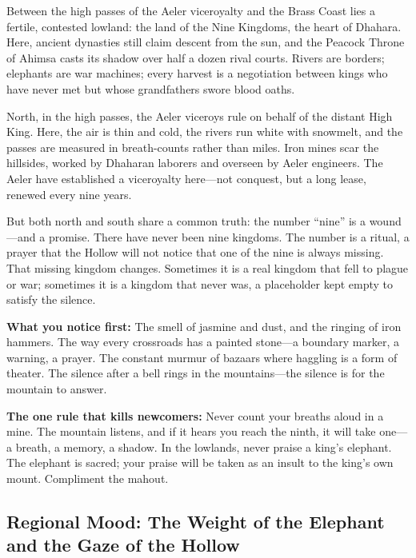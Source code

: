 \vspace{2mm}
\begin{tcolorbox}[colback=black!3,colframe=blue!60!black,title={Theme \& Atmosphere},breakable]
Between the high passes of the Aeler viceroyalty and the Brass Coast lies a fertile, contested lowland: the land of the Nine Kingdoms, the heart of Dhahara. Here, ancient dynasties still claim descent from the sun, and the Peacock Throne of Ahimsa casts its shadow over half a dozen rival courts. Rivers are borders; elephants are war machines; every harvest is a negotiation between kings who have never met but whose grandfathers swore blood oaths.

North, in the high passes, the Aeler viceroys rule on behalf of the distant High King. Here, the air is thin and cold, the rivers run white with snowmelt, and the passes are measured in breath-counts rather than miles. Iron mines scar the hillsides, worked by Dhaharan laborers and overseen by Aeler engineers. The Aeler have established a viceroyalty here---not conquest, but a long lease, renewed every nine years.

But both north and south share a common truth: the number ``nine'' is a wound---and a promise. There have never been nine kingdoms. The number is a ritual, a prayer that the Hollow will not notice that one of the nine is always missing. That missing kingdom changes. Sometimes it is a real kingdom that fell to plague or war; sometimes it is a kingdom that never was, a placeholder kept empty to satisfy the silence.

\vspace{2mm}
\textbf{What you notice first:} The smell of jasmine and dust, and the ringing of iron hammers. The way every crossroads has a painted stone---a boundary marker, a warning, a prayer. The constant murmur of bazaars where haggling is a form of theater. The silence after a bell rings in the mountains---the silence is for the mountain to answer.

\textbf{The one rule that kills newcomers:} Never count your breaths aloud in a mine. The mountain listens, and if it hears you reach the ninth, it will take one---a breath, a memory, a shadow. In the lowlands, never praise a king's elephant. The elephant is sacred; your praise will be taken as an insult to the king's own mount. Compliment the mahout.
\end{tcolorbox}

\subsection*{Regional Mood: The Weight of the Elephant and the Gaze of the Hollow}

